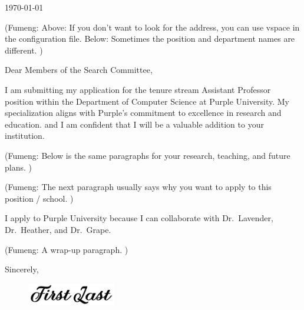 \documentclass{article}
\newcommand{\Dr}[1]{Dr.~#1}
\newcommand{\fy}[1]{(Fumeng: #1)}
\begin{document}
\makeheader
\makefooter


\mainfont\fontsize{9pt}{9pt}\selectfont

\linespread{1.5} 
\setlength{\parskip}{4pt}

\vspace{1.75em}

 \today
 
 \vspace{1.75em}



\vspace{2.2em}


\fy{Above: If you don't want to look for the address, you can use vspace in the configuration file. Below: Sometimes the position and department names are different. } 

Dear Members of the Search Committee,

I am submitting my application for
the tenure stream Assistant Professor position within the Department of Computer Science at Purple University.
My specialization aligns with 
Purple's commitment to excellence in research and education.
and I am confident that I will be a valuable addition to your institution.

\fy{Below is the same paragraphs for your research, teaching, and future plans. }

\lipsum[4-5]

\fy{The next paragraph usually says why you want to apply to this position / school. }

I apply to Purple University because I can collaborate with \Dr{Lavender}, \Dr{Heather}, and \Dr{Grape}.

\fy{A wrap-up paragraph. }

\lipsum[6]













\vspace{4em}

Sincerely,
\begin{figure}[h]
	\includegraphics[height=1cm]{../fig/sign.png}
	\vspace*{-10pt}
\end{figure}

\mynamePhD
\end{document}
